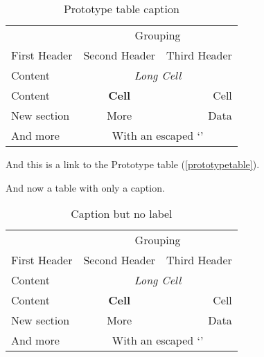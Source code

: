 
\def\mytitle{MultiMarkdown Table Test  }
\def\latexmode{memoir}

\begin{table}[htbp]
\begin{minipage}{\linewidth}
\setlength{\tymax}{0.5\linewidth}
\centering
\small
\caption{Prototype table caption}
\label{prototypetable}
\begin{tabular}{@{}lcr@{}} \\ \toprule
&\multicolumn{2}{c}{Grouping}\\
First Header&Second Header&Third Header\\
\midrule
Content&\multicolumn{2}{c}{{\itshape Long Cell}}\\
Content&\textbf{Cell}&Cell\\

\midrule
New section&More&Data\\
And more&\multicolumn{2}{c}{With an escaped `\textbar{}'}\\

\bottomrule

\end{tabular}
\end{minipage}
\end{table}


And this is a link to the Prototype table (\autoref{prototypetable}).

And now a table with only a caption.

\begin{table}[htbp]
\begin{minipage}{\linewidth}
\setlength{\tymax}{0.5\linewidth}
\centering
\small
\caption{Caption but no label}
\label{captionbutnolabel}
\begin{tabular}{@{}lcr@{}} \\ \toprule
&\multicolumn{2}{c}{Grouping}\\
First Header&Second Header&Third Header\\
\midrule
Content&\multicolumn{2}{c}{{\itshape Long Cell}}\\
Content&\textbf{Cell}&Cell\\

\midrule
New section&More&Data\\
And more&\multicolumn{2}{c}{With an escaped `\textbar{}'}\\

\bottomrule

\end{tabular}
\end{minipage}
\end{table}


